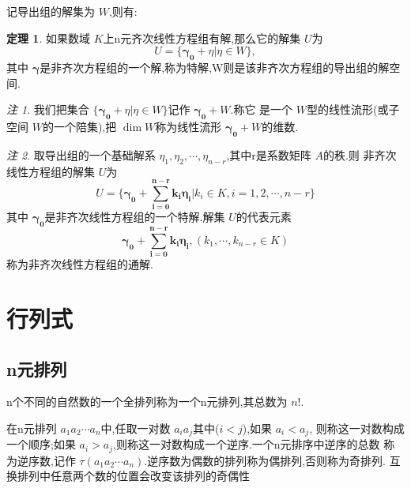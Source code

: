 \documentclass[a4paper,11pt]{article}%
\theoremstyle{remark}
\newtheorem*{remark}{注}
\theoremstyle{definition}
\newtheorem{theorem}{定理}[section]
\theoremstyle{definition}
\theoremstyle{plain}
\begin{document}
记导出组的解集为 $W$,则有:
\begin{theorem}
    如果数域 $K$上n元齐次线性方程组有解,那么它的解集 $U$为
    \[U=\{\bm{\gamma_0}+\eta\vert\eta\in W\},\]
    其中 $\bm{\gamma}$是非齐次方程组的一个解,称为特解,W则是该非齐次方程组的导出组的解空间.
\end{theorem}
\begin{remark}
    我们把集合 $\{\bm{\gamma_0}+\eta\vert\eta\in W\}$记作 $\bm{\gamma_0}+W$.称它
    是一个 $W$型的线性流形(或子空间 $W$的一个陪集),把 $\dim W$称为线性流形 $\bm{\gamma_0}+W$的维数.
\end{remark}
\begin{remark}
    取导出组的一个基础解系 $\eta_1,\eta_2,\cdots,\eta_{n-r}$,其中r是系数矩阵 $A$的秩.则
    非齐次线性方程组的解集 $U$为
    \[U=\{\bm{\gamma_0+\sum_{i=0}^{n-r}{k_i\eta_i}}\vert k_i\in K,i=1,2,\cdots,n-r\}\]
    其中 $\bm{\gamma_0}$是非齐次线性方程组的一个特解.解集 $U$的代表元素
    \[\bm{\gamma_0+\sum_{i=0}^{n-r}{k_i\eta_i}},(k_1,\cdots,k_{n-r}\in K)\]
    称为非齐次线性方程组的通解.
\end{remark}
\section{行列式}
\subsection{n元排列}
n个不同的自然数的一个全排列称为一个n元排列,其总数为 $n!$.

在n元排列 $a_1a_2\cdots a_n$中,任取一对数 $a_ia_j$其中($i<j$),如果 $a_i<a_j$,
则称这一对数构成一个顺序;如果 $a_i>a_j$,则称这一对数构成一个逆序.一个n元排序中逆序的总数
称为逆序数,记作 $\tau (a_1a_2\cdots a_n)$.逆序数为偶数的排列称为偶排列,否则称为奇排列.
互换排列中任意两个数的位置会改变该排列的奇偶性
\end{document}
